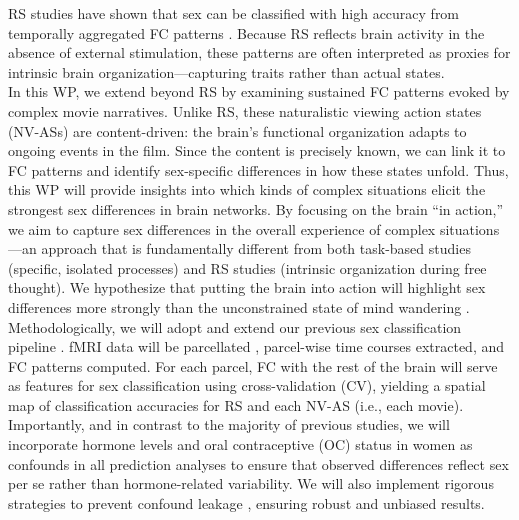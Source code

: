 \documentclass[11pt,a4paper]{article}
\begin{document}
RS studies have shown that sex can be classified with high accuracy from temporally aggregated FC 
patterns \parencite{casanovaCombiningGraphMachine2012a,ritchieSexDifferencesAdult2018,weisSexClassificationResting2020a,wierschAccurateSexPrediction2023a,wierschSexDifferencesBrain2021a}. 
Because RS reflects brain activity in the absence of external stimulation, these patterns are often 
interpreted as proxies for intrinsic brain organization—capturing traits rather than actual states.\\ 
In this WP, we extend beyond RS by examining sustained FC patterns evoked by complex movie narratives. 
Unlike RS, these naturalistic viewing action states (NV-ASs) are content-driven: the brain's functional organization 
adapts to ongoing events in the film. Since the content is precisely known, we can link it to FC patterns and 
identify sex-specific differences in how these states unfold. 
Thus, this WP will provide insights into which kinds of complex situations elicit the strongest sex differences in 
brain networks. 
By focusing on the brain “in action,” we aim to capture sex differences in the overall experience of 
complex situations—an approach that is fundamentally different from both task-based studies 
(specific, isolated processes) and RS studies (intrinsic organization during free thought). 
We hypothesize that putting the brain into action will highlight sex differences more strongly than the 
unconstrained state of mind wandering \parencite{vanderwalIndividualDifferencesFunctional2017}.\\
Methodologically, we will adopt and extend our previous sex classification pipeline \parencite{weisSexClassificationResting2020a}. 
fMRI data will be parcellated \parencite{schaeferLocalGlobalParcellationHuman2018}, parcel-wise time courses extracted, 
and FC patterns computed. For each parcel, FC with the rest of the brain will serve as features for 
sex classification using cross-validation (CV), yielding a spatial map of classification accuracies for RS and 
each NV-AS (i.e., each movie).
Importantly, and in contrast to the majority of previous studies, we will incorporate hormone levels and oral contraceptive (OC) status in women as confounds in all 
prediction analyses to ensure that observed differences reflect sex per se rather than hormone-related variability. 
We will also implement rigorous strategies to prevent confound leakage \parencite{hamdanConfoundleakageConfoundRemoval2022a}, 
ensuring robust and unbiased results.
\end{document}
